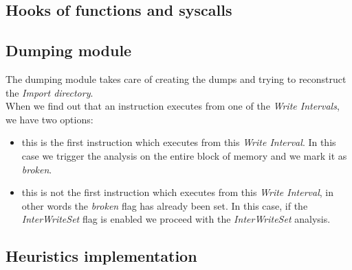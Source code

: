 \subsection{Hooks of functions and syscalls}
\label{Hooks of functions and syscalls}

\subsection{Dumping module}
The dumping module takes care of creating the dumps and trying to reconstruct the \textit{Import directory}.\\
When we find out that an instruction executes from one of the \textit{Write Intervals}, we have two options:
\begin{itemize}
\item this is the first instruction which executes from this \textit{Write Interval}. In this case we trigger the analysis on the entire block of memory and we mark it as \textit{broken}.
\item this is not the first instruction which executes from this \textit{Write Interval}, in other words the \textit{broken} flag has already been set. In this case, if the \textit{InterWriteSet} flag is enabled we proceed with the \textit{InterWriteSet} analysis.
\end{itemize}
\label{Dumping module}

\subsection{Heuristics implementation}
\label{Heuristics implementation}